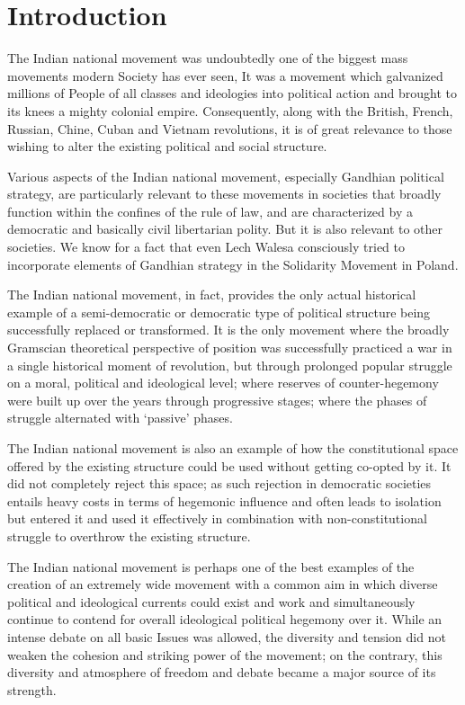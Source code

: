 \chapter*{Introduction}

\begin{multicols}{2}

The Indian national movement was undoubtedly one of the biggest mass movements modern Society has ever seen, It was a movement which galvanized millions of People of all classes and ideologies into political action and brought to its knees a mighty colonial empire. Consequently, along with the British, French, Russian, Chine, Cuban and Vietnam revolutions, it is of great relevance to those wishing to alter the existing political and social structure.

Various aspects of the Indian national movement, especially Gandhian political strategy, are particularly relevant to these movements in societies that broadly function within the confines of the rule of law, and are characterized by a democratic and basically civil libertarian polity. But it is also relevant to other societies. We know for a fact that even Lech Walesa consciously tried to incorporate elements of Gandhian strategy in the Solidarity Movement in Poland.

The Indian national movement, in fact, provides the only actual historical example of a semi-democratic or democratic type of political structure being successfully replaced or transformed. It is the only movement where the broadly Gramscian theoretical perspective of position was successfully practiced a war in a single historical moment of revolution, but through prolonged popular struggle on a moral, political and ideological level; where reserves of counter-hegemony were built up over the years through progressive stages; where the phases of struggle alternated with `passive' phases.

The Indian national movement is also an example of how the constitutional space offered by the existing structure could be used without getting co-opted by it. It did not completely reject this space; as such rejection in democratic societies entails heavy costs in terms of hegemonic influence and often leads to isolation but entered it and used it effectively in combination with non-constitutional struggle to overthrow the existing structure.

The Indian national movement is perhaps one of the best examples of the creation of an extremely wide movement with a common aim in which diverse political and ideological currents could exist and work and simultaneously continue to contend for overall ideological political hegemony over it. While an intense debate on all basic Issues was allowed, the diversity and tension did not weaken the cohesion and striking power of the movement; on the contrary, this diversity and atmosphere of freedom and debate became a major source of its strength.


\end{multicols}

